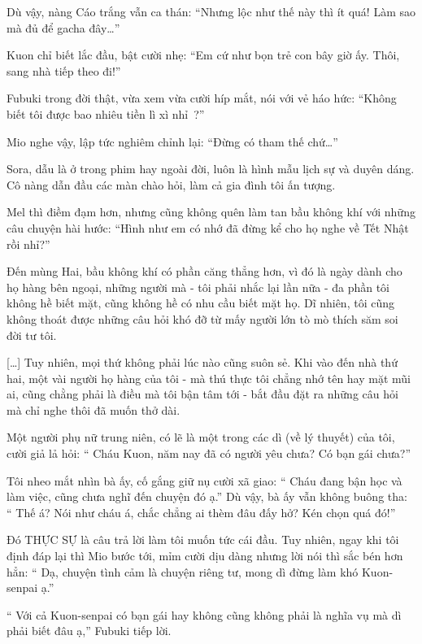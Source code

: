\documentclass[../main.tex]{subfiles}
\begin{document}
Dù vậy, nàng Cáo trắng vẫn ca thán: ``Nhưng lộc như thế này thì ít quá! Làm sao mà đủ để gacha đây\dots''

Kuon chỉ biết lắc đầu, bật cười nhẹ: ``Em cứ như bọn trẻ con bây giờ ấy. Thôi, sang nhà tiếp theo đi!''

\il

Fubuki trong đời thật, vừa xem vừa cười híp mắt, nói với vẻ háo hức: ``Không biết tôi được bao nhiêu tiền lì xì nhỉ~?''

Mio nghe vậy, lập tức nghiêm chỉnh lại: ``Đừng có tham thế chứ\dots''

Sora, dẫu là ở trong phim hay ngoài đời, luôn là hình mẫu lịch sự và duyên dáng. Cô nàng dẫn đầu các màn chào hỏi, làm cả gia đình tôi ấn tượng.

Mel thì điềm đạm hơn, nhưng cũng không quên làm tan bầu không khí với những câu chuyện hài hước: ``Hình như em có nhớ đã đừng kể cho họ nghe về Tết Nhật rồi nhỉ?''

Đến mùng Hai, bầu không khí có phần căng thẳng hơn, vì đó là ngày dành cho họ hàng bên ngoại, những người mà - tôi phải nhắc lại lần nữa - đa phần tôi không hề biết mặt, cũng không hề có nhu cầu biết mặt họ. Dĩ nhiên, tôi cũng không thoát được những câu hỏi khó đỡ từ mấy người lớn tò mò thích săm soi đời tư tôi.

\il

[\dots] Tuy nhiên, mọi thứ không phải lúc nào cũng suôn sẻ. Khi vào đến nhà thứ hai, một vài người họ hàng của tôi - mà thú thực tôi chẳng nhớ tên hay mặt mũi ai, cũng chằng phải là điều mà tôi bận tâm tới - bắt đầu đặt ra những câu hỏi mà chỉ nghe thôi đã muốn thở dài.

Một người phụ nữ trung niên, có lẽ là một trong các dì (về lý thuyết) của tôi, cười giả lả hỏi: ``{\color{red} Cháu Kuon, năm nay đã có người yêu chưa? Có bạn gái chưa?}''

Tôi nheo mắt nhìn bà ấy, cố gắng giữ nụ cười xã giao: ``{\color{red} Cháu đang bận học và làm việc, cũng chưa nghĩ đến chuyện đó ạ.}'' Dù vậy, bà ấy vẫn không buông tha: ``{\color{red} Thế á? Nói như cháu á, chắc chẳng ai thèm đâu đấy hở? Kén chọn quá đó!}''

Đó THỰC SỰ là câu trả lời làm tôi muốn tức cái đầu. Tuy nhiên, ngay khi tôi định đáp lại thì Mio bước tới, mỉm cười dịu dàng nhưng lời nói thì sắc bén hơn hẳn: ``{\color{red} Dạ, chuyện tình cảm là chuyện riêng tư, mong dì đừng làm khó Kuon-senpai ạ.}''

``{\color{red} Với cả Kuon-senpai có bạn gái hay không cũng không phải là nghĩa vụ mà dì phải biết đâu ạ,}'' Fubuki tiếp lời.
\end{document}
